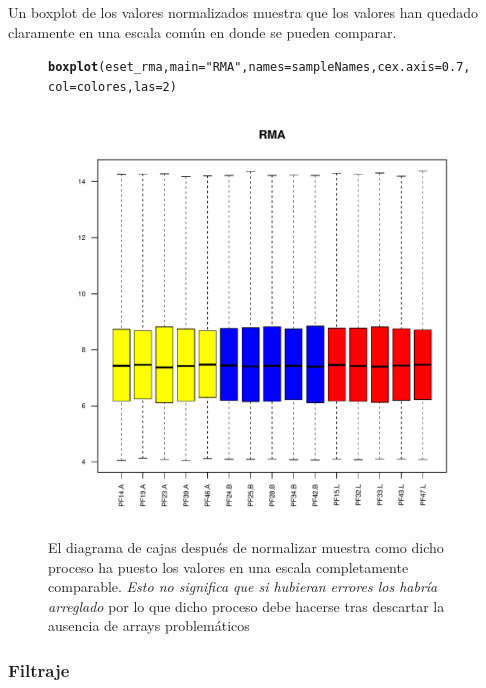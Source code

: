 \documentclass[a4paper]{article}\usepackage[]{graphicx}\usepackage[]{color}
\makeatletter
\def\maxwidth{ %
  \ifdim\Gin@nat@width>\linewidth
    \linewidth
  \else
    \Gin@nat@width
  \fi
}
\newcommand{\hlnum}[1]{\textcolor[rgb]{0.686,0.059,0.569}{#1}}%
\newcommand{\hlstr}[1]{\textcolor[rgb]{0.192,0.494,0.8}{#1}}%
\newcommand{\hlstd}[1]{\textcolor[rgb]{0.345,0.345,0.345}{#1}}%
\newcommand{\hlkwc}[1]{\textcolor[rgb]{0.333,0.667,0.333}{#1}}%
\newcommand{\hlkwd}[1]{\textcolor[rgb]{0.737,0.353,0.396}{\textbf{#1}}}%
\newenvironment{kframe}{%
 \def\at@end@of@kframe{}%
 \ifinner\ifhmode%
  \def\at@end@of@kframe{\end{minipage}}%
  \begin{minipage}{\columnwidth}%
 \fi\fi%
 \def\FrameCommand##1{\hskip\@totalleftmargin \hskip-\fboxsep
 \colorbox{shadecolor}{##1}\hskip-\fboxsep
     \hskip-\linewidth \hskip-\@totalleftmargin \hskip\columnwidth}%
 \MakeFramed {\advance\hsize-\width
   \@totalleftmargin\z@ \linewidth\hsize
   \@setminipage}}%
 {\par\unskip\endMakeFramed%
 \at@end@of@kframe}
\newenvironment{knitrout}{}{} %
\makeatother
\begin{document}
Un boxplot de los valores normalizados muestra que los valores han quedado claramente en una escala común en donde se pueden comparar.
\begin{figure}[htbp]
\centering
\begin{knitrout}
\color{fgcolor}\begin{kframe}
\begin{alltt}
\hlkwd{boxplot}\hlstd{(eset_rma,}\hlkwc{main}\hlstd{=}\hlstr{"RMA"}\hlstd{,} \hlkwc{names}\hlstd{=sampleNames,} \hlkwc{cex.axis}\hlstd{=}\hlnum{0.7}\hlstd{,} \hlkwc{col}\hlstd{=colores,}\hlkwc{las}\hlstd{=}\hlnum{2}\hlstd{)}
\end{alltt}
\end{kframe}
\includegraphics[width=\maxwidth]{images/graficnormBoxPlot-1} 

\end{knitrout}
\caption{El diagrama de cajas después de normalizar muestra como dicho proceso ha puesto los valores en una escala completamente comparable. \emph{Esto no significa que si hubieran errores los habría arreglado} por lo que dicho proceso debe hacerse tras descartar la ausencia de arrays problemáticos}
\label{fig:boxplot}
\end{figure}

\subsubsection{Filtraje}
\end{document}
